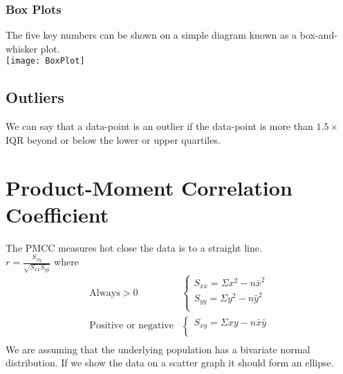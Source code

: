 \documentclass[class=article, crop=false]{standalone}
\begin{document}
\subsubsection*{Box Plots} 
The five key numbers can be shown on a simple diagram known as a box-and-whisker plot.\\
\texttt{[image: BoxPlot]}\\

\subsection*{Outliers}
We can say that a data-point is an outlier if the data-point is more than $1.5 \times$ IQR beyond or below the lower or upper quartiles. 
\section*{Product-Moment Correlation Coefficient}
The PMCC measures hot close the data is to a straight line. \\
$r = \frac{S_{xy}}{\sqrt{S_{xx}S_{yy}}}$ where
\begin{align*}
\text{Always} > 0 & \begin{cases}
S_{xx} = \Sigma x^2 - n \bar{x}^2 \\
S_{yy} = \Sigma y^2 - n \bar{y}^2 \\
\end{cases} \\
\text{Positive or negative} & \begin{cases}
S_{xy} = \Sigma xy - n \bar{x} \bar{y} \\
\end{cases} \\
\end{align*}
We are assuming that the underlying population has a bivariate normal distribution. If we show the data on a scatter graph it should form an ellipse. 
\end{document}
